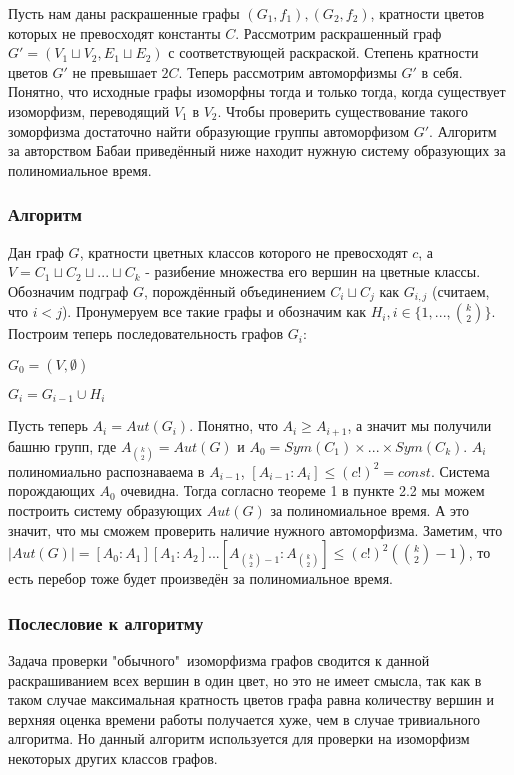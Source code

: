 Пусть нам даны раскрашенные графы $(G_1, f_1), (G_2, f_2)$, кратности цветов которых не превосходят константы $C$. Рассмотрим раскрашенный граф $G'=(V_1 \sqcup V_2, E_1 \sqcup E_2)$ с соответствующей раскраской. Степень кратности цветов $G'$ не превышает $2C$. Теперь рассмотрим автоморфизмы $G'$ в себя. Понятно, что исходные графы изоморфны тогда и только тогда, когда существует изоморфизм, переводящий $V_1$ в $V_2$. Чтобы проверить существование такого зоморфизма достаточно найти образующие группы автоморфизом $G'$. Алгоритм за авторством Бабаи приведённый ниже находит нужную систему образующих за полиномиальное время.

\subsubsection*{Алгоритм}

Дан граф $G$, кратности цветных классов которого не превосходят $c$, а $V = C_1 \sqcup C_2 \sqcup ... \sqcup C_k$ - разибение множества его вершин на цветные классы. Обозначим подграф $G$, порождённый объединением $C_i \sqcup C_j$ как $G_{i,j}$ (считаем, что $i < j$). Пронумеруем все такие графы и обозначим как $H_i, i \in \{1, ..., \binom{k}{2}\}$. Построим теперь последовательность графов $G_i$:
    
$G_0 = (V, \emptyset)$

$G_i = G_{i-1} \cup H_i$

Пусть теперь $A_i = Aut(G_i)$. Понятно, что $A_i \geqslant A_{i + 1}$, а значит мы получили башню групп, где $A_{\binom{k}{2}} = Aut(G)$ и $A_0 = Sym(C_1) \times ... \times Sym(C_k)$. $A_i$ полиномиально распознаваема в $A_{i-1}$, $[A_{i-1}:A_i] \leqslant (c!)^2 = const$. Система порождающих $A_0$ очевидна. Тогда согласно теореме 1 в пункте 2.2 мы можем построить систему образующих $Aut(G)$ за полиномиальное время. А это значит, что мы сможем проверить наличие нужного автоморфизма. Заметим, что $|Aut(G)| = [A_0 : A_1] [A_1 : A_2] ... [A_{\binom{k}{2}-1} : A_{\binom{k}{2}}] \leqslant (c!)^2 (\binom{k}{2}-1)$, то есть перебор тоже будет произведён за полиномиальное время.

\subsubsection*{Послесловие к алгоритму}

Задача проверки "обычного"\ изоморфизма графов сводится к данной раскрашиванием всех вершин в один цвет, но это не имеет смысла, так как в таком случае максимальная кратность цветов графа равна количеству вершин и верхняя оценка времени работы получается хуже, чем в случае тривиального алгоритма. Но данный алгоритм используется для проверки на изоморфизм некоторых других классов графов.